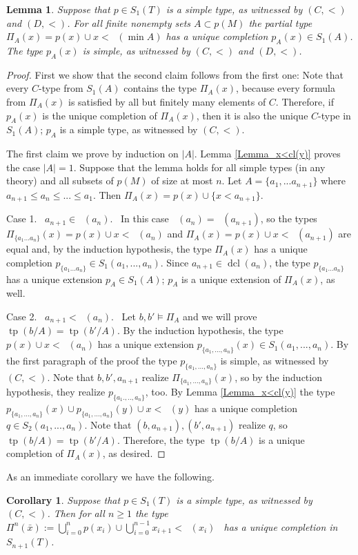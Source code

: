 \documentclass[12pt]{amsart}
\newtheorem{Lemma}[Theorem]{Lemma}
\newtheorem{Corollary}[Theorem]{Corollary}
\theoremstyle{definition}
\DeclareMathOperator{\cl}{cl_S}
\DeclareMathOperator{\dcl}{dcl}
\DeclareMathOperator{\tp}{tp}
\begin{document}
\begin{Lemma}\label{Lemma_cl_n}
Suppose that $p\in S_1(T)$ is a simple type, as witnessed by $(C,<)$ and $(D,<)$.
For all finite nonempty sets $A\subset p(M)$ the partial type $\Pi_A(x)=p(x)\cup x<\cl(\min A)$ has a unique completion $p_A(x)\in S_1(A)$.  The type $p_A(x)$ is simple, as witnessed by $(C,<)$ and $(D,<)$.
\end{Lemma}
\begin{proof}First we show that the second claim follows from the first one: Note that every $C$-type from $S_1(A)$ contains the type $\Pi_A(x)$, because every formula from $\Pi_A(x)$ is satisfied by all but finitely many elements of $C$. Therefore, if $p_A(x)$ is the unique completion of $\Pi_A(x)$, then it is also the unique $C$-type in $S_1(A)$;  $p_A$ is a simple type, as witnessed by $(C,<)$.


The first claim we prove by induction on $|A|$.  Lemma \ref{Lemma_x<cl(y)} proves the case $|A|=1$. 
Suppose that the lemma holds for all simple types (in any theory) and all subsets of $p(M)$  of size at most $n$. Let $A=\{a_1,...a_{n+1}\}$ where $a_{n+1}\leq a_n\leq ...\leq a_{1}$. Then $\Pi_A(x)=p(x)\cup\{x<a_{n+1}\}$. 

Case 1. \ $a_{n+1}\in \cl(a_n)$. \ In this case $\cl(a_n)=\cl(a_{n+1})$, so the types $\Pi_{\{a_1...a_n\}}(x)=p(x)\cup x<\cl(a_n)$ and $\Pi_{A}(x)=p(x)\cup x<\cl(a_{n+1})$ 
are equal and, by the induction hypothesis, the type $\Pi_A(x)$ has a unique completion $p_{\{a_1...a_n\}}\in S_1(a_1,...,a_n)$. Since 
$a_{n+1}\in \dcl(a_n)$, the type $p_{\{a_1...a_n\}}$ has a unique extension $p_A\in S_1(A)$; $p_A$  is a unique extension of $\Pi_A(x)$, as well.   

Case 2. \ $a_{n+1}<\cl(a_n)$. \ Let $b,b'\models \Pi_A$ and we will prove $\tp(b/A)=\tp(b'/A)$. By the induction hypothesis, the type $p(x)\cup x<\cl(a_n)$ has a unique extension $p_{\{a_1,...,a_n\}}(x)\in S_1(a_1,...,a_n)$. By the first paragraph of the proof the type  $p_{\{a_1,...,a_n\}} $ is  simple, as  witnessed by $(C,<)$. Note that $b,b',a_{n+1}$ realize $\Pi_{\{a_1,...,a_n\}}(x)$, so by the induction hypothesis, they realize $p_{\{a_1.,..,a_n\}}$, too. By Lemma \ref{Lemma_x<cl(y)}  the type $p_{\{a_1,...,a_n\}}(x)\cup p_{\{a_1,...,a_n\}}(y) \cup x<\cl(y)$ has a unique completion   $q\in S_2(a_1,...,a_n)$. Note that $(b,a_{n+1}), (b',a_{n+1})$ realize $q$, so  $\tp(b/A)=\tp(b'/A)$. Therefore, the type $\tp(b/A)$ is a  unique completion of $\Pi_A(x)$, as desired.
\end{proof}
As an immediate corollary we have the following.
\begin{Corollary}\label{Cor_pntypes}
Suppose that $p\in S_1(T)$ is a simple type, as witnessed by $(C,<)$. Then for all $n\geq 1$ the type 
 \ $\Pi^n(\bar x):=\bigcup_{i=0}^n p(x_i)\cup \bigcup_{i=0}^{n-1} x_{i+1}<\cl(x_i)$ \
has a unique completion in $S_{n+1}(T)$. 
\end{Corollary}
\end{document}
